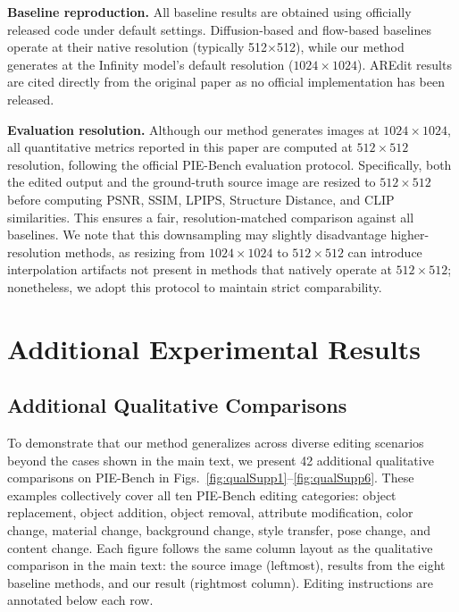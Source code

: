 \noindent\textbf{Baseline reproduction.}
All baseline results are obtained using officially released code under default settings. Diffusion-based and flow-based baselines operate at their native resolution (typically 512$\times$512), while our method generates at the Infinity model's default resolution ($1024{\times}1024$). AREdit results are cited directly from the original paper as no official implementation has been released.

\noindent\textbf{Evaluation resolution.}
Although our method generates images at $1024{\times}1024$, all quantitative metrics reported in this paper are computed at $512{\times}512$ resolution, following the official PIE-Bench evaluation protocol. Specifically, both the edited output and the ground-truth source image are resized to $512{\times}512$ before computing PSNR, SSIM, LPIPS, Structure Distance, and CLIP similarities. This ensures a fair, resolution-matched comparison against all baselines. We note that this downsampling may slightly disadvantage higher-resolution methods, as resizing from $1024{\times}1024$ to $512{\times}512$ can introduce interpolation artifacts not present in methods that natively operate at $512{\times}512$; nonetheless, we adopt this protocol to maintain strict comparability.


\section{Additional Experimental Results}
\label{sec:supp_results}

\subsection{Additional Qualitative Comparisons}
\label{sec:supp_qualitative}

To demonstrate that our method generalizes across diverse editing scenarios beyond the cases shown in the main text, we present 42 additional qualitative comparisons on PIE-Bench in Figs.~\ref{fig:qualSupp1}--\ref{fig:qualSupp6}. These examples collectively cover all ten PIE-Bench editing categories: object replacement, object addition, object removal, attribute modification, color change, material change, background change, style transfer, pose change, and content change. Each figure follows the same column layout as the qualitative comparison in the main text: the source image (leftmost), results from the eight baseline methods, and our result (rightmost column). Editing instructions are annotated below each row.

